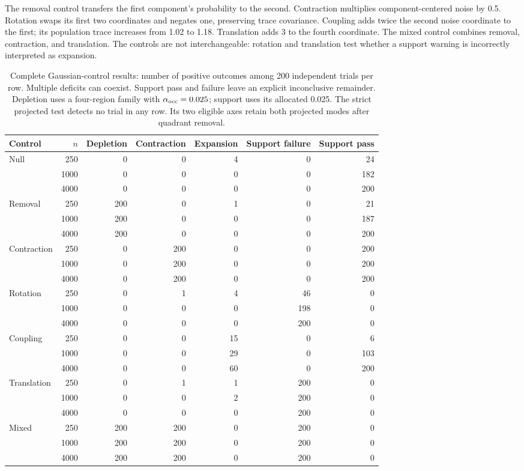 The removal control transfers the first component's probability to the second.
Contraction multiplies component-centered noise by 0.5. Rotation swaps its
first two coordinates and negates one, preserving trace covariance. Coupling
adds twice the second noise coordinate to the first; its population trace
increases from 1.02 to 1.18. Translation adds 3 to the fourth coordinate.
The mixed control combines removal, contraction, and translation.
The controls are not interchangeable: rotation and translation test whether a
support warning is incorrectly interpreted as expansion.

\begin{table}[t]
\centering\small
\setlength{\tabcolsep}{6pt}
\begin{tabular}{lrrrrrr}
\toprule
Control & $n$ & Depletion & Contraction & Expansion & Support failure & Support pass\\
\midrule
Null &250&0&0&4&0&24\\
&1000&0&0&0&0&182\\
&4000&0&0&0&0&200\\
Removal &250&200&0&1&0&21\\
&1000&200&0&0&0&187\\
&4000&200&0&0&0&200\\
Contraction &250&0&200&0&0&200\\
&1000&0&200&0&0&200\\
&4000&0&200&0&0&200\\
Rotation &250&0&1&4&46&0\\
&1000&0&0&0&198&0\\
&4000&0&0&0&200&0\\
Coupling &250&0&0&15&0&6\\
&1000&0&0&29&0&103\\
&4000&0&0&60&0&200\\
Translation &250&0&1&1&200&0\\
&1000&0&0&2&200&0\\
&4000&0&0&0&200&0\\
Mixed &250&200&200&0&200&0\\
&1000&200&200&0&200&0\\
&4000&200&200&0&200&0\\
\bottomrule
\end{tabular}
\caption{Complete Gaussian-control results: number of positive outcomes among
200 independent trials per row. Multiple deficits can coexist. Support pass and
failure leave an explicit inconclusive remainder. Depletion uses a four-region
family with $\alpha_{\rm occ}=0.025$; support uses its allocated 0.025. The strict
projected test detects no trial in any row. Its two eligible axes retain both
projected modes after quadrant removal.}
\label{tab:support-gaussian}
\end{table}

